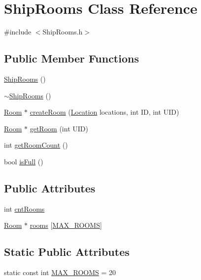 \hypertarget{classShipRooms}{\section{Ship\-Rooms Class Reference}
\label{classShipRooms}
}


{\ttfamily \#include $<$Ship\-Rooms.\-h$>$}

\subsection*{Public Member Functions}
\begin{DoxyCompactItemize}
\item 
\hyperlink{classShipRooms_ae299a6bbd005215c8658477a7b597145}{Ship\-Rooms} ()
\item 
\hyperlink{classShipRooms_a91ffe6717a8fe8111221214b60a2a58e}{$\sim$\-Ship\-Rooms} ()
\item 
\hyperlink{classRoom}{Room} $\ast$ \hyperlink{classShipRooms_ac12f32192d9d412ed326ece60b9d4546}{create\-Room} (\hyperlink{structLocation}{Location} locations, int I\-D, int U\-I\-D)
\item 
\hyperlink{classRoom}{Room} $\ast$ \hyperlink{classShipRooms_a8b495f2e403bbcf1662a8cf0b7ee0ca8}{get\-Room} (int U\-I\-D)
\item 
int \hyperlink{classShipRooms_a75d0e81e4a6c2377bcfb76a015b1585e}{get\-Room\-Count} ()
\item 
bool \hyperlink{classShipRooms_a7ef60080c85ae4495e9ff4dc7fd74818}{is\-Full} ()
\end{DoxyCompactItemize}
\subsection*{Public Attributes}
\begin{DoxyCompactItemize}
\item 
int \hyperlink{classShipRooms_abfd5908b44d8d104c0357035db2a11a0}{cnt\-Rooms}
\item 
\hyperlink{classRoom}{Room} $\ast$ \hyperlink{classShipRooms_a52ced61edb73b269c13ad86c37d58678}{rooms} \mbox{[}\hyperlink{classShipRooms_a4c6a08678ec28bde999016e8980b7493}{M\-A\-X\-\_\-\-R\-O\-O\-M\-S}\mbox{]}
\end{DoxyCompactItemize}
\subsection*{Static Public Attributes}
\begin{DoxyCompactItemize}
\item 
static const int \hyperlink{classShipRooms_a4c6a08678ec28bde999016e8980b7493}{M\-A\-X\-\_\-\-R\-O\-O\-M\-S} = 20
\end{DoxyCompactItemize}


